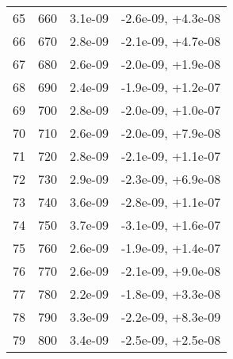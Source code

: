 \begin{table}
\begin{adjustbox}{width=1\textwidth/2}
\begin{tabular}{|c|c|c|c|}
\cline{1-4}
65 & 660 & 3.1e-09 & -2.6e-09, +4.3e-08 \\
\cline{1-4}
66 & 670 & 2.8e-09 & -2.1e-09, +4.7e-08 \\
\cline{1-4}
67 & 680 & 2.6e-09 & -2.0e-09, +1.9e-08 \\
\cline{1-4}
68 & 690 & 2.4e-09 & -1.9e-09, +1.2e-07 \\
\cline{1-4}
69 & 700 & 2.8e-09 & -2.0e-09, +1.0e-07 \\
\cline{1-4}
70 & 710 & 2.6e-09 & -2.0e-09, +7.9e-08 \\
\cline{1-4}
71 & 720 & 2.8e-09 & -2.1e-09, +1.1e-07 \\
\cline{1-4}
72 & 730 & 2.9e-09 & -2.3e-09, +6.9e-08 \\
\cline{1-4}
73 & 740 & 3.6e-09 & -2.8e-09, +1.1e-07 \\
\cline{1-4}
74 & 750 & 3.7e-09 & -3.1e-09, +1.6e-07 \\
\cline{1-4}
75 & 760 & 2.6e-09 & -1.9e-09, +1.4e-07 \\
\cline{1-4}
76 & 770 & 2.6e-09 & -2.1e-09, +9.0e-08 \\
\cline{1-4}
77 & 780 & 2.2e-09 & -1.8e-09, +3.3e-08 \\
\cline{1-4}
78 & 790 & 3.3e-09 & -2.2e-09, +8.3e-09 \\
\cline{1-4}
79 & 800 & 3.4e-09 & -2.5e-09, +2.5e-08 \\
\cline{1-4}
\end{tabular}
\end{adjustbox}
\end{table}

